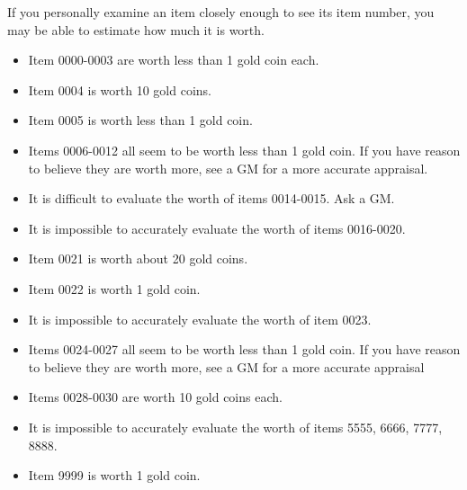 \documentclass[green]{Kos}
\begin{document}
\name{\gAppraise{}}

If you personally examine an item closely enough to see its item number, you may be able to estimate how much it is worth.

\begin{itemize}
\item Item 0000-0003 are worth less than 1 gold coin each.
\item Item 0004 is worth 10 gold coins.
\item Item 0005 is worth less than 1 gold coin.
\item Items 0006-0012 all seem to be worth less than 1 gold coin. If you have reason to believe they are worth more, see a GM for a more accurate appraisal.
\item It is difficult to evaluate the worth of items 0014-0015. Ask a GM.
\item It is impossible to accurately evaluate the worth of items 0016-0020.
\item Item 0021 is worth about 20 gold coins.
\item Item 0022 is worth 1 gold coin.
\item It is impossible to accurately evaluate the worth of item 0023.
\item Items 0024-0027 all seem to be worth less than 1 gold coin. If you have reason to believe they are worth more, see a GM for a more accurate appraisal
\item Items 0028-0030 are worth 10 gold coins each.
\item It is impossible to accurately evaluate the worth of items 5555, 6666, 7777, 8888.
\item Item 9999 is worth 1 gold coin.
\end{itemize}
\end{document}

